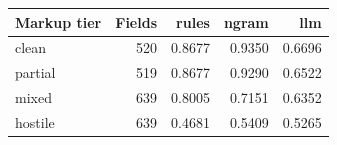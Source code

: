 \begingroup\small\setlength{\tabcolsep}{4pt}
\begin{tabular}{lrrrr}
\toprule
\textbf{Markup tier} & \textbf{Fields} & \textbf{rules} & \textbf{ngram} & \textbf{llm} \\
\midrule
clean & 520 & 0.8677 & 0.9350 & 0.6696 \\  %
partial & 519 & 0.8677 & 0.9290 & 0.6522 \\  %
mixed & 639 & 0.8005 & 0.7151 & 0.6352 \\  %
hostile & 639 & 0.4681 & 0.5409 & 0.5265 \\  %
\bottomrule
\end{tabular}
\endgroup
\par\smallskip{}
